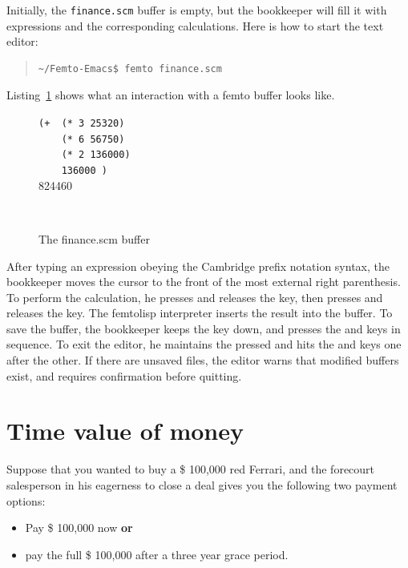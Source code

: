 \documentclass[a4paper,12pt]{book}
\newenvironment{fmpage}[1]
               {\begin{lrbox}{\fmbox}\begin{minipage}{#1}}
               {\end{minipage}\end{lrbox}\fbox{\usebox{\fmbox}}}
\begin{document}
Initially, the \verb|finance.scm| buffer
is empty, but the bookkeeper will fill it
with expressions and the corresponding
calculations. Here is how to start the
text editor:
\begin{quote}
\begin{verbatim}
~/Femto-Emacs$ femto finance.scm
\end{verbatim}
\end{quote}
Listing~\ref{texan:photos} shows what
an interaction with a femto buffer looks like.

\begin{figure}[!h]
\begin{fmpage}{0.8\textwidth}

\verb|(+  (* 3 25320)|\\
\verb|    (* 6 56750)|\\
\verb|    (* 2 136000)|\\
\verb|    136000 )|\keys{~]~}\\ 
824460
\end{fmpage}

\begin{fmpage}{0.8\textwidth}
\verb| |
\end{fmpage}
\caption{The finance.scm buffer}
\label{texan:photos}
\end{figure}

After typing an expression obeying the
Cambridge prefix notation syntax,
the bookkeeper moves the cursor to the front
of the most external right parenthesis.
To perform the calculation,
he presses and releases the
 key, then presses and releases
the \keys{~]~} key. The femtolisp
  interpreter inserts the result
  into the buffer.
  To save the buffer, the bookkeeper
  keeps the  key down,
  and presses the  and
   keys in sequence.
  To exit the
  editor, he maintains the 
  pressed and hits the 
  and  keys one after the other.
  If there are
  unsaved files, the editor warns
  that modified buffers exist,
  and requires confirmation before
  quitting.
  
\section{Time value of money}
Suppose that you wanted to buy a \$ 100,000 red Ferrari,
and the forecourt salesperson in his eagerness to
close a deal gives you the following two payment options:  
\begin{itemize}
\item Pay \$ 100,000 now {\bf or}
\item pay the full \$ 100,000 after a three year grace period.
\end{itemize}
\end{document}
